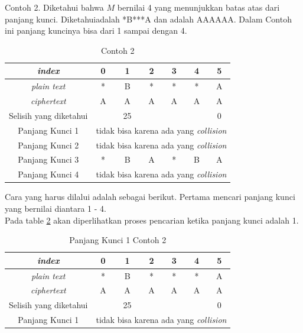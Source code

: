 	 Contoh 2. Diketahui bahwa $M$ bernilai 4 yang menunjukkan batas atas dari panjang kunci. Diketahui\plaintext adalah *B***A dan \ciphertext adalah AAAAAA. Dalam Contoh ini panjang kuncinya bisa dari 1 sampai dengan 4. 
	 \begin{table}[H]
	 	\centering
	 	
	 	\begin{tabular}{|c|c|c|c|c|c|c|}\hline
		\textit{index}&0&1&2&3&4&5\\ \hline
	 	\textit{plain text}&*&B&*&*&*&A\\ \hline
	 	\textit{ciphertext}&A&A&A&A&A&A\\ \hline
	 	Selisih yang diketahui& &25& & & &0\\ \hline
	 	Panjang Kunci 1 & \multicolumn{6}{c|}{tidak bisa karena ada yang \textit{collision}}\\ \hline
	 	Panjang Kunci 2 & \multicolumn{6}{c|}{tidak bisa karena ada yang \textit{collision}}\\ \hline
	 	Panjang Kunci 3 &*&B&A&*&B&A \\ \hline
	 	Panjang Kunci 4 & \multicolumn{6}{c|}{tidak bisa karena ada yang \textit{collision}}\\ \hline
	 	\end{tabular}
	 	\caption{Contoh 2}
	 	\label{tab:contoh2}
	\end{table}
	Cara yang harus dilalui adalah sebagai berikut. Pertama mencari panjang kunci yang bernilai diantara 1 - 4. \\
	Pada table \ref{tab:k1contoh2} akan diperlihatkan proses pencarian ketika panjang kunci adalah 1.
	\begin{table}[H]
	 	\centering
	 	\setlength{\arrayrulewidth}{.08em}
	 	\begin{tabular}{|c|c|c|c|c|c|c|}\hline
		\textit{index}&0&1&2&3&4&5\\ \hline
	 	\textit{plain text}&\cellcolor{blue!15}*&\cellcolor{yellow!25}B&\cellcolor{green!15}*&\cellcolor{lime!25}*&\cellcolor{pink!30}*&\cellcolor{red!25}A\\ \hline
	 	\textit{ciphertext}&\cellcolor{blue!15}A&\cellcolor{yellow!25}A&\cellcolor{green!15}A&\cellcolor{lime!25}A&\cellcolor{pink!30}A&\cellcolor{red!25}A\\ \hline
	 	Selisih yang diketahui& &25& & & &0\\ \hline
	 	Panjang Kunci 1 & \multicolumn{6}{c|}{tidak bisa karena ada yang \textit{collision}}\\ \hline
	 	\end{tabular}
	 	\caption{Panjang Kunci 1 Contoh 2}
	 	\label{tab:k1contoh2}
	\end{table}	
	
